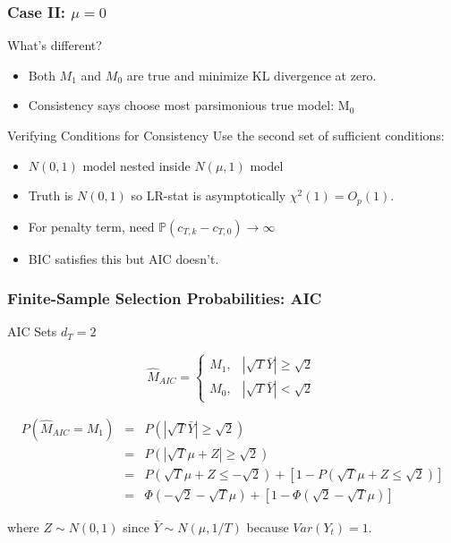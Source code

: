\begin{frame}
  \frametitle{Case II: $\mu = 0$}

  \begin{block}{What's different?}
  \begin{itemize}
    \item Both $M_1$ and $M_0$ are true and minimize KL divergence at zero. 
    \item \alert{Consistency} says choose most parsimonious true model: $\text{M}_0$
  \end{itemize}
  \end{block}

  \begin{block}{Verifying Conditions for Consistency}
    Use the second set of sufficient conditions:
    \begin{itemize}
      \item $N(0,1)$ model nested inside $N(\mu,1)$ model
      \item Truth is $N(0,1)$ so LR-stat is asymptotically $\chi^2(1) = O_p(1)$.
      \item For penalty term, need $\mathbb{P}(c_{T,k} - c_{T,0})\rightarrow \infty$
      \item BIC satisfies this but AIC doesn't.
    \end{itemize}
    
  \end{block}
\end{frame}
\begin{frame}
  \frametitle{Finite-Sample Selection Probabilities: AIC}
  \begin{block}{AIC Sets $d_T = 2$}


	$$\widehat{M}_{AIC} = \left\{\begin{array}
		{cc} M_1, &|\sqrt{T}\bar{Y}| \geq \sqrt{2} \\
		M_0, & |\sqrt{T} \bar{Y}| < \sqrt{2}
	\end{array} \right.$$
  \end{block}

  \vspace{-2em}

    \footnotesize
	\begin{eqnarray*}
		P\left(\widehat{M}_{AIC} = M_1\right) &=& P\left(\left|\sqrt{T}\bar{Y} \right| \geq \sqrt{2}  \right)\\
		&=& P\left(\left|\sqrt{T}\mu + Z\right| \geq \sqrt{2}  \right)\\
		&=& P\left(\sqrt{T}\mu + Z \leq -\sqrt{2}\right) + \left[1 - P\left(\sqrt{T} \mu +Z \leq \sqrt{2}\right) \right]\\
			&=& \Phi\left(-\sqrt{2} - \sqrt{T}\mu\right) + \left[1 -  \Phi\left(\sqrt{2} - \sqrt{T} \mu \right)\right]
	\end{eqnarray*}

  \normalsize
where $Z \sim N(0,1)$ since $\bar{Y} \sim N(\mu, 1/T)$ because $Var(Y_t)=1$.
\end{frame}
